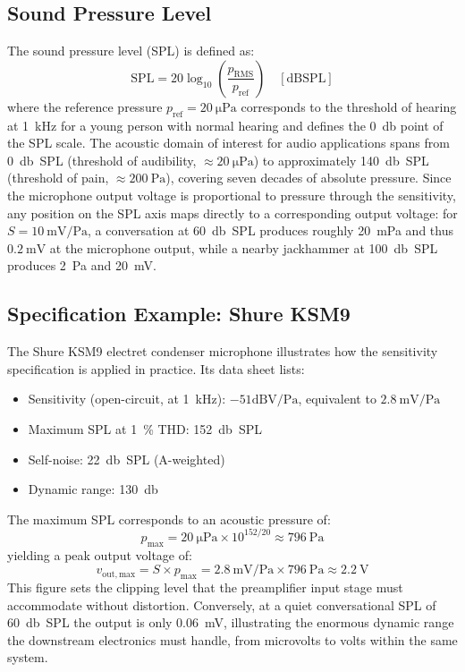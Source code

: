 \subsection{Sound Pressure Level}

The sound pressure level (SPL) is defined as:
\[
\mathrm{SPL} = 20\log_{10}\left(\frac{p_{\mathrm{RMS}}}{p_{\mathrm{ref}}}\right) \quad [\mathrm{dB SPL}]
\]
where the reference pressure \(p_{\mathrm{ref}} = \SI{20}{\micro\pascal}\) corresponds to the threshold of hearing at \SI{1}{\kilo\hertz} for a young person with normal hearing and defines the \SI{0}{\decibel} point of the SPL scale.
The acoustic domain of interest for audio applications spans from \SI{0}{\decibel SPL} (threshold of audibility, \(\approx \SI{20}{\micro\pascal}\)) to approximately \SI{140}{\decibel SPL} (threshold of pain, \(\approx \SI{200}{\pascal}\)), covering seven decades of absolute pressure.
Since the microphone output voltage is proportional to pressure through the sensitivity, any position on the SPL axis maps directly to a corresponding output voltage: for \(S = \SI{10}{\milli\volt\per\pascal}\), a conversation at \SI{60}{\decibel SPL} produces roughly \SI{20}{\milli\pascal} and thus \(\SI{0.2}{\milli\volt}\) at the microphone output, while a nearby jackhammer at \SI{100}{\decibel SPL} produces \SI{2}{\pascal} and \SI{20}{\milli\volt}.

\subsection{Specification Example: Shure KSM9}

The Shure KSM9 electret condenser microphone illustrates how the sensitivity specification is applied in practice.
Its data sheet lists:
\begin{itemize}
    \item Sensitivity (open-circuit, at \SI{1}{\kilo\hertz}): \(-51 \mathrm{dBV/Pa}\), equivalent to \(\SI{2.8}{\milli\volt\per\pascal}\)
    \item Maximum SPL at \SI{1}{\percent} THD: \SI{152}{\decibel SPL}
    \item Self-noise: \SI{22}{\decibel SPL} (A-weighted)
    \item Dynamic range: \SI{130}{\decibel}
\end{itemize}
The maximum SPL corresponds to an acoustic pressure of:
\[
p_{\mathrm{max}} = \SI{20}{\micro\pascal} \times 10^{152/20} \approx \SI{796}{\pascal}
\]
yielding a peak output voltage of:
\[
v_{\mathrm{out,max}} = S \times p_{\mathrm{max}} = \SI{2.8}{\milli\volt\per\pascal} \times \SI{796}{\pascal} \approx \SI{2.2}{\volt}
\]
This figure sets the clipping level that the preamplifier input stage must accommodate without distortion.
Conversely, at a quiet conversational SPL of \SI{60}{\decibel SPL} the output is only \SI{0.06}{\milli\volt}, illustrating the enormous dynamic range the downstream electronics must handle, from microvolts to volts within the same system.

